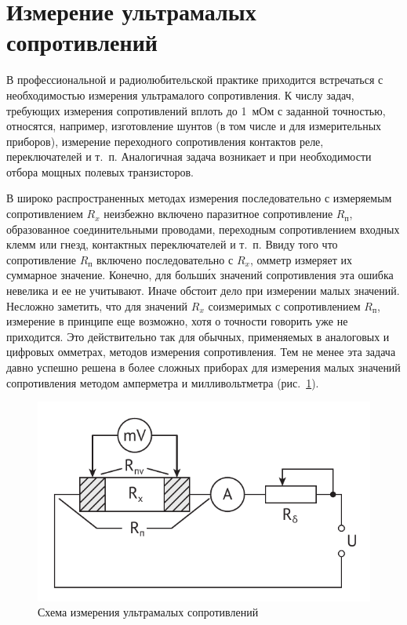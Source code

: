 \documentclass[pscyr]{hedwork}
\newcommand{\Pic}[1]{\ref{pic#1}}
\newcommand{\pic}[1]{рис.~\Pic{#1}}
\begin{document}
  \section{Измерение ультрамалых сопротивлений}

  В профессиональной и радиолюбительской практике приходится встречаться с
  необходимостью измерения ультрамалого сопротивления. К числу задач, требующих
  измерения сопротивлений вплоть до 1~мОм с заданной точностью, относятся,
  например, изготовление шунтов (в том числе и для измерительных приборов),
  измерение переходного сопротивления контактов реле, переключателей и т.~п.
  Аналогичная задача возникает и при необходимости отбора мощных полевых
  транзисторов.
  
  В широко распространенных методах измерения последовательно с измеряемым
  сопротивлением \( R_x \) неизбежно включено паразитное сопротивление
  \( R_\text{п} \), образованное соединительными проводами, переходным
  сопротивлением входных клемм или гнезд, контактных переключателей и т.~п.
  Ввиду того что сопротивление \( R_\text{п} \) включено последовательно с
  \( R_x \), омметр измеряет их суммарное значение. Конечно, для больш\'{и}х
  значений сопротивления эта ошибка невелика и ее не учитывают. Иначе обстоит
  дело при измерении малых значений. Несложно заметить, что для значений
  \( R_x \) соизмеримых с сопротивлением \( R_\text{п} \), измерение в принципе
  еще возможно, хотя о точности говорить уже не приходится. Это действительно
  так для обычных, применяемых в аналоговых и цифровых омметрах, методов
  измерения сопротивления. Тем не менее эта задача давно успешно решена в более
  сложных приборах для измерения малых значений сопротивления методом амперметра
  и милливольтметра (\pic{ultra}).
  
  \begin{figure}[!t]
    \center
    \includegraphics[width=.6\textwidth]{ultra}
    \caption{Схема измерения ультрамалых сопротивлений}
    \label{picultra}
  \end{figure}
 
\end{document}

